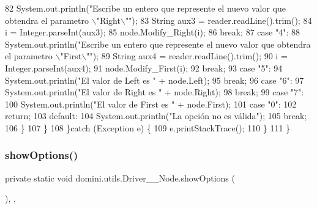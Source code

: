 \begin{DoxyCode}
82                     System.out.println(\textcolor{stringliteral}{"Escribe un entero que represente el nuevo valor que obtendra el
       parametro \(\backslash\)"Right\(\backslash\)""});
83                     String aux3 = reader.readLine().trim();
84                     i = Integer.parseInt(aux3);
85                     node.Modify\_Right(i);
86                 \textcolor{keywordflow}{break};
87                 \textcolor{keywordflow}{case} \textcolor{stringliteral}{"4"}:
88                     System.out.println(\textcolor{stringliteral}{"Escribe un entero que represente el nuevo valor que obtendra el
       parametro \(\backslash\)"First\(\backslash\)""});
89                     String aux4 = reader.readLine().trim();
90                     i = Integer.parseInt(aux4);
91                     node.Modify\_First(i);
92                 \textcolor{keywordflow}{break};
93                 \textcolor{keywordflow}{case} \textcolor{stringliteral}{"5"}:
94                     System.out.println(\textcolor{stringliteral}{"El valor de Left es "} + node.Left);
95                 \textcolor{keywordflow}{break};
96                 \textcolor{keywordflow}{case} \textcolor{stringliteral}{"6"}:
97                     System.out.println(\textcolor{stringliteral}{"El valor de Right es "} + node.Right);
98                 \textcolor{keywordflow}{break};
99                 \textcolor{keywordflow}{case} \textcolor{stringliteral}{"7"}:
100                     System.out.println(\textcolor{stringliteral}{"El valor de First es "} + node.First);
101                 \textcolor{keywordflow}{case} \textcolor{stringliteral}{"0"}:
102                     \textcolor{keywordflow}{return};
103                 \textcolor{keywordflow}{default}:
104                     System.out.println(\textcolor{stringliteral}{"La opción no es válida"});
105                 \textcolor{keywordflow}{break};
106             \}
107         \}
108     \}\textcolor{keywordflow}{catch} (Exception e) \{
109         e.printStackTrace();
110     \}
111     \}
\end{DoxyCode}
\mbox{\label{classdomini_1_1utils_1_1Driver____Node_a3e1022f470676f7cbbeb44b9b2d4f66f}} 
\subsubsection{\texorpdfstring{show\+Options()}{showOptions()}}
{\footnotesize\ttfamily private static void domini.\+utils.\+Driver\+\_\+\+\_\+\+Node.\+show\+Options (\begin{DoxyParamCaption}{ }\end{DoxyParamCaption})\hspace{0.3cm}{\ttfamily [inline]}, {\ttfamily [static]}, {\ttfamily [private]}}



